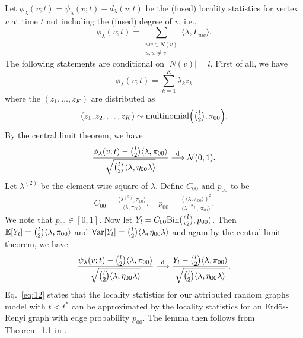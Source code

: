 \documentclass[10pt,journal,compsoc]{IEEEtran}
\theoremstyle{definition}
\begin{document}
\begin{IEEEproof}[Lemma~7]
Let $\phi_{\lambda}(v;t) = \psi_{\lambda}(v;t) - d_{\lambda}(v;t)$ be
the (fused) locality statistics for
vertex $v$ at time $t$ not including the (fused) degree of $v$, i.e.,
\begin{equation}
  \label{eq:11}
  \phi_{\lambda}(v;t) = \sum_{\substack{uw
      \in N(v) \\ u,w \not = v}} \langle \lambda,
  \Gamma_{uw} \rangle.
\end{equation}
The following statements are conditional on $|N(v)| = l$. First
of all, we have
\begin{equation*}
  \phi_{\lambda}(v;t) = \sum_{k=1}^{K}{\lambda_k z_k}
\end{equation*}
where the $(z_1, \dots, z_K)$ are distributed as
\begin{gather*}
  (z_1,z_2,\dots,z_K) \sim \textrm{multinomial}\Bigl(
  \tbinom{l}{2}, \pi_{00}\Bigr). 
\end{gather*}
By the central limit theorem, we have
\begin{equation*}
  \frac{\phi_\lambda(v;t) - \tbinom{l}{2} \langle \lambda, \pi_{00}
    \rangle}{\sqrt{\tbinom{l}{2} \langle \lambda, \eta_{00} \lambda \rangle}}
  \overset{\mathrm{d}}{\longrightarrow} \mathcal{N}(0,1).
\end{equation*}
Let $\lambda^{(2)}$ be the element-wise square of $\lambda$. Define
$C_{00}$ and $p_{00}$ to be 
 \begin{gather}
   \label{eq:26}
   C_{00} = \tfrac{\langle \lambda^{(2)}, \pi_{00} \rangle}{\langle \lambda,
     \pi_{00}\rangle}, \quad p_{00} = \tfrac{(\langle \lambda, \pi_{00}
     \rangle)^{2}}{\langle \lambda^{(2)},\, \pi_{00} \rangle}.
 \end{gather}
 We note that $p_{00} \in [0,1]$. Now let $Y_{l} = C_{00}
 \mathrm{Bin}(\tbinom{l}{2}, p_{00})$. Then $\mathbb{E}[Y_l] =
 \tbinom{l}{2} \langle \lambda, \pi_{00} \rangle$ and
 $\mathrm{Var}[Y_l] = \tbinom{l}{2} \langle \lambda, \eta_{00} \lambda
 \rangle$ and again by the central limit theorem, we have
\begin{equation}
  \label{eq:12}
  \frac{\psi_{\lambda}(v;t) - \tbinom{l}{2} \langle \lambda, \pi_{00}
    \rangle}{\sqrt{\tbinom{l}{2} \langle \lambda, \eta_{00} \lambda
      \rangle}}   \overset{\mathrm{d}}{\longrightarrow} \frac{Y_l -
    \tbinom{l}{2} \langle \lambda, \pi_{00} \rangle}{\sqrt{\tbinom{l}{2}
    \langle \lambda, \eta_{00} \lambda \rangle}}.
\end{equation}
Eq.~\eqref{eq:12} states that the locality statistics for our
attributed random graphs model with $t < t^{*}$
can be approximated by the locality statistics for an Erd\"{o}s-Renyi
graph with edge probability $p_{00}$. The lemma then follows
from Theorem~1.1 in \cite{rukhin12}.
\end{IEEEproof}
\end{document}
